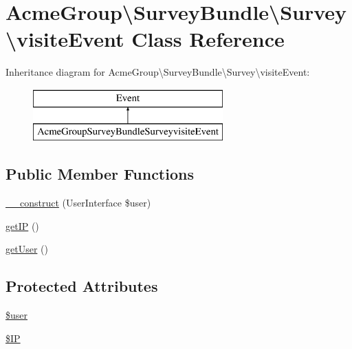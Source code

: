 \hypertarget{class_acme_group_1_1_survey_bundle_1_1_survey_1_1visite_event}{\section{Acme\+Group\textbackslash{}Survey\+Bundle\textbackslash{}Survey\textbackslash{}visite\+Event Class Reference}
\label{class_acme_group_1_1_survey_bundle_1_1_survey_1_1visite_event}
}
Inheritance diagram for Acme\+Group\textbackslash{}Survey\+Bundle\textbackslash{}Survey\textbackslash{}visite\+Event\+:\begin{figure}[H]
\begin{center}
\leavevmode
\includegraphics[height=2.000000cm]{class_acme_group_1_1_survey_bundle_1_1_survey_1_1visite_event}
\end{center}
\end{figure}
\subsection*{Public Member Functions}
\begin{DoxyCompactItemize}
\item 
\hyperlink{class_acme_group_1_1_survey_bundle_1_1_survey_1_1visite_event_ae15a8a7308551af501dc06ea5f654ba5}{\+\_\+\+\_\+construct} (User\+Interface \$user)
\item 
\hyperlink{class_acme_group_1_1_survey_bundle_1_1_survey_1_1visite_event_a382f673241f77e3c02ac7743aa216a98}{get\+I\+P} ()
\item 
\hyperlink{class_acme_group_1_1_survey_bundle_1_1_survey_1_1visite_event_a36f3468004c5ccddaafe11c647604580}{get\+User} ()
\end{DoxyCompactItemize}
\subsection*{Protected Attributes}
\begin{DoxyCompactItemize}
\item 
\hyperlink{class_acme_group_1_1_survey_bundle_1_1_survey_1_1visite_event_ae75e38753c87c66885e745e47c29ed32}{\$user}
\item 
\hyperlink{class_acme_group_1_1_survey_bundle_1_1_survey_1_1visite_event_aa52a499aad007681c33f821e634a7ba9}{\$\+I\+P}
\end{DoxyCompactItemize}


